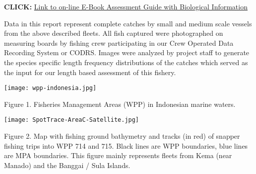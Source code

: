 \textbf{CLICK: }\href{http://72.14.187.103:8080/ifish/pub/DeepSlopeSpeciesAssessmentTool.pdf}{Link to on-line E-Book Assessment Guide with Biological Information}

Data in this report represent complete catches by small and medium scale vessels from the above described fleets. All fish captured were photographed on measuring boards by fishing crew participating in our Crew Operated Data Recording System or CODRS. Images were analyzed by project staff to generate the species specific length frequency distributions of the catches which served as the input for our length based assessment of this fishery.

\begin{center}
\graphicspath{{/root/R-project/IFishSnapperWPP714_715/Images/}}
\texttt{[image: wpp-indonesia.jpg]}

Figure 1. Fisheries Management Areas (WPP) in Indonesian marine waters.
\end{center}

\begin{center}
\graphicspath{{/root/R-project/IFishSnapperWPP714_715/Images/}}
\texttt{[image: SpotTrace-AreaC-Satellite.jpg]}

Figure 2. Map with fishing ground bathymetry and tracks (in red) of snapper fishing trips into WPP 714 and 715. Black lines are WPP boundaries, blue lines are MPA boundaries. This figure mainly represents fleets from Kema (near Manado) and the Banggai / Sula Islands.
\end{center}